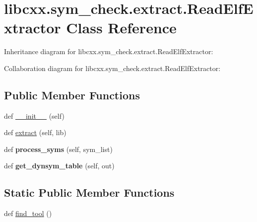 \hypertarget{classlibcxx_1_1sym__check_1_1extract_1_1_read_elf_extractor}{}\section{libcxx.\+sym\+\_\+check.\+extract.\+Read\+Elf\+Extractor Class Reference}
\label{classlibcxx_1_1sym__check_1_1extract_1_1_read_elf_extractor}


Inheritance diagram for libcxx.\+sym\+\_\+check.\+extract.\+Read\+Elf\+Extractor\+:


Collaboration diagram for libcxx.\+sym\+\_\+check.\+extract.\+Read\+Elf\+Extractor\+:
\subsection*{Public Member Functions}
\begin{DoxyCompactItemize}
\item 
def \mbox{\hyperlink{classlibcxx_1_1sym__check_1_1extract_1_1_read_elf_extractor_a007a016ce8a4182553bb78f572875f08}{\+\_\+\+\_\+init\+\_\+\+\_\+}} (self)
\item 
def \mbox{\hyperlink{classlibcxx_1_1sym__check_1_1extract_1_1_read_elf_extractor_a72a619001676329d5201fd80d40b345b}{extract}} (self, lib)
\item 
\mbox{\label{classlibcxx_1_1sym__check_1_1extract_1_1_read_elf_extractor_ac636a1fb32de5f7d0a9fd55dcb7e4a21}} 
def {\bfseries process\+\_\+syms} (self, sym\+\_\+list)
\item 
\mbox{\label{classlibcxx_1_1sym__check_1_1extract_1_1_read_elf_extractor_a9205970c7dfa18e7589e9c803b4f6a02}} 
def {\bfseries get\+\_\+dynsym\+\_\+table} (self, out)
\end{DoxyCompactItemize}
\subsection*{Static Public Member Functions}
\begin{DoxyCompactItemize}
\item 
def \mbox{\hyperlink{classlibcxx_1_1sym__check_1_1extract_1_1_read_elf_extractor_af50a43ed629bbd1bce6488730a6767ac}{find\+\_\+tool}} ()
\end{DoxyCompactItemize}
